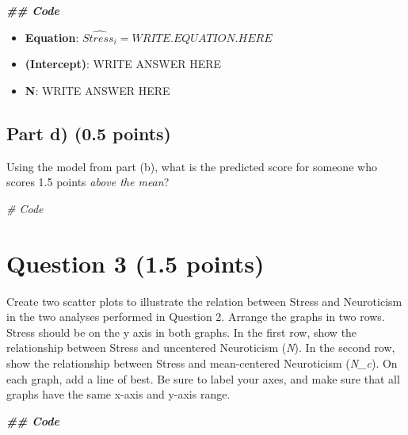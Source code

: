 \documentclass[
]{article}
\newenvironment{Shaded}{\begin{snugshade}}{\end{snugshade}}
\newcommand{\CommentTok}[1]{\textcolor[rgb]{0.56,0.35,0.01}{\textit{#1}}}
\newcommand{\DocumentationTok}[1]{\textcolor[rgb]{0.56,0.35,0.01}{\textbf{\textit{#1}}}}
\begin{document}
\begin{Shaded}
\begin{Highlighting}[]
\DocumentationTok{\#\# Code}
\end{Highlighting}
\end{Shaded}

\begin{itemize}
\item
  \textbf{Equation}: \(\widehat{Stress_i} = WRITE.EQUATION.HERE\)
\item
  \textbf{(Intercept)}: WRITE ANSWER HERE
\item
  \textbf{N}: WRITE ANSWER HERE
\end{itemize}

\hypertarget{part-d-0.5-points}{%
\subsection{\texorpdfstring{Part d) \textbf{(0.5
points)}}{Part d) (0.5 points)}}\label{part-d-0.5-points}}

Using the model from part (b), what is the predicted score for someone
who scores 1.5 points \emph{above the mean}?

\begin{Shaded}
\begin{Highlighting}[]
\CommentTok{\# Code}
\end{Highlighting}
\end{Shaded}

\hypertarget{question-3-1.5-points}{%
\section{\texorpdfstring{Question 3 \textbf{(1.5
points)}}{Question 3 (1.5 points)}}\label{question-3-1.5-points}}

Create two scatter plots to illustrate the relation between Stress and
Neuroticism in the two analyses performed in Question 2. Arrange the
graphs in two rows. Stress should be on the y axis in both graphs. In
the first row, show the relationship between Stress and uncentered
Neuroticism (\emph{N}). In the second row, show the relationship between
Stress and mean-centered Neuroticism (\emph{N\_c}). On each graph, add a
line of best. Be sure to label your axes, and make sure that all graphs
have the same x-axis and y-axis range.

\begin{Shaded}
\begin{Highlighting}[]
\DocumentationTok{\#\# Code}
\end{Highlighting}
\end{Shaded}
\end{document}
